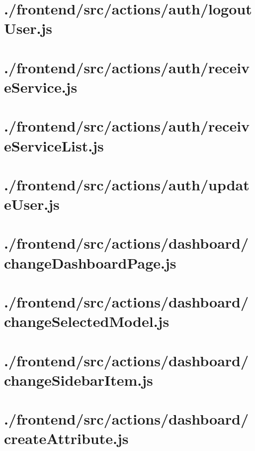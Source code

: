 \documentclass[11pt]{informatics-report}
\begin{document}
\newpage
\section{./frontend/src/actions/auth/logoutUser.js}


\newpage
\section{./frontend/src/actions/auth/receiveService.js}


\newpage
\section{./frontend/src/actions/auth/receiveServiceList.js}


\newpage
\section{./frontend/src/actions/auth/updateUser.js}


\newpage
\section{./frontend/src/actions/dashboard/changeDashboardPage.js}


\newpage
\section{./frontend/src/actions/dashboard/changeSelectedModel.js}


\newpage
\section{./frontend/src/actions/dashboard/changeSidebarItem.js}


\newpage
\section{./frontend/src/actions/dashboard/createAttribute.js}

\end{document}
